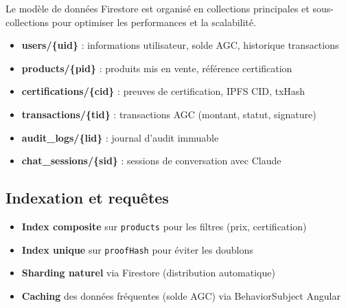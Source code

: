 \documentclass[12pt,a4paper]{report}
\begin{document}
\noindent
Le modèle de données Firestore est organisé en collections principales et sous-collections
pour optimiser les performances et la scalabilité.

\vspace{0.1cm}

\begin{tcolorbox}[definbox,title={Collections Firestore}]
  \begin{itemize}[itemsep=4pt]
    \item \textbf{users/\{uid\}} : informations utilisateur, solde AGC, historique transactions
    \item \textbf{products/\{pid\}} : produits mis en vente, référence certification
    \item \textbf{certifications/\{cid\}} : preuves de certification, IPFS CID, txHash
    \item \textbf{transactions/\{tid\}} : transactions AGC (montant, statut, signature)
    \item \textbf{audit\_logs/\{lid\}} : journal d'audit immuable
    \item \textbf{chat\_sessions/\{sid\}} : sessions de conversation avec Claude
  \end{itemize}
\end{tcolorbox}

\vspace{0.2cm}

\subsection{Indexation et requêtes}

\begin{tcolorbox}[infobox,title={Stratégie d'indexation}]
  \begin{itemize}[itemsep=4pt]
    \item \textbf{Index composite} sur \texttt{products} pour les filtres (prix, certification)
    \item \textbf{Index unique} sur \texttt{proofHash} pour éviter les doublons
    \item \textbf{Sharding naturel} via Firestore (distribution automatique)
    \item \textbf{Caching} des données fréquentes (solde AGC) via BehaviorSubject Angular
  \end{itemize}
\end{tcolorbox}

\vspace{0.2cm}
\end{document}
